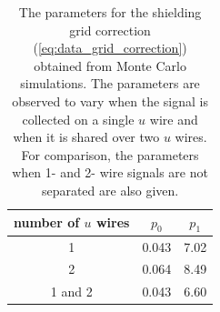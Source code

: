 \documentclass[herrin-thesis.tex]{subfiles}
\begin{document}
\begin{table}[htp]
\centering
\caption[Shielding grid correction parameters]{The parameters for the shielding grid correction (\cref{eq:data_grid_correction}) obtained from Monte Carlo simulations. The parameters are observed to vary when the signal is collected on a single \(u\) wire and when it is shared over two \(u\) wires. For comparison, the parameters when 1- and 2- wire signals are not separated are also given.}
\label{tab:data_grid_correction_parameters}
\begin{tabular}{c c c}\toprule
number of \(u\) wires	&	\(p_0\)	&	\(p_1\)	\\\midrule
1				&	0.043	&	7.02		\\
2				&	0.064	&	8.49		\\
1 and 2			&	0.043	&	6.60		\\\bottomrule
\end{tabular}
\end{table}
\end{document}
